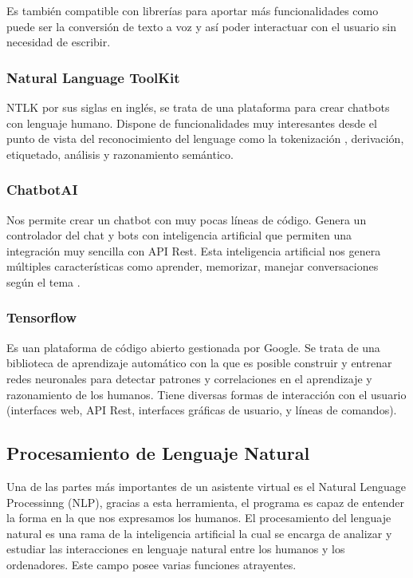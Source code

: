 Es también compatible con librerías para aportar más funcionalidades como puede ser la conversión de texto a voz y así poder interactuar con el usuario sin necesidad de escribir.

\subsubsection{Natural Language ToolKit} NTLK por sus siglas en inglés, se trata de una plataforma para crear chatbots con lenguaje humano. Dispone de funcionalidades muy interesantes desde el punto de vista del reconocimiento del lenguage como la tokenización , derivación, etiquetado, análisis y razonamiento semántico.

\subsubsection{ChatbotAI} Nos permite crear un chatbot con muy pocas líneas de código. Genera un controlador del chat y bots con inteligencia artificial que permiten una integración muy sencilla con API Rest. Esta inteligencia artificial nos genera múltiples características como aprender, memorizar, manejar conversaciones según el tema \cite{chatbotAI}. 

\subsubsection{Tensorflow} Es uan plataforma de código abierto gestionada por Google. Se trata de una biblioteca de aprendizaje automático con la que es posible construir y entrenar redes neuronales para detectar patrones y correlaciones en el aprendizaje y razonamiento de los humanos. Tiene diversas formas de interacción con el usuario (interfaces web, API Rest, interfaces gráficas de usuario, y líneas de comandos).

\subsection{Procesamiento de Lenguaje Natural}
Una de las partes más importantes de un asistente virtual es el Natural Lenguage Processinng (NLP), gracias a esta herramienta, el programa es capaz de entender la forma en la que nos expresamos los humanos. 
El procesamiento del lenguaje natural es una rama de la inteligencia artificial la cual se encarga de analizar y estudiar las interacciones en lenguaje natural entre los humanos y los ordenadores. Este campo posee varias funciones atrayentes.

